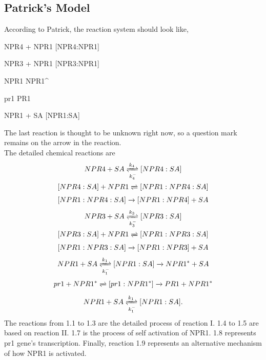\subsection{Patrick's Model}
According to Patrick, the reaction system should look like,
\begin{chemmath}
	NPR4 + NPR1 
	[NPR4:NPR1]
\end{chemmath}
\begin{chemmath}
	NPR3 + NPR1
	[NPR3:NPR1]
\end{chemmath}
\begin{chemmath}
	NPR1
	NPR1^{\ast}
\end{chemmath}
\begin{chemmath}
	pr1
	PR1
\end{chemmath}
\begin{chemmath}
	NPR1 + SA 
	[NPR1:SA]
\end{chemmath}
The last reaction is thought to be unknown right now, so a question mark remains on the arrow in the reaction. \\
The detailed chemical reactions are
\begin{gather}\label{P_re_I}
NPR4 + SA \xrightleftharpoons[k_4^-]{k_4} [NPR4:SA] \\
[NPR4:SA] + NPR1 \xrightleftharpoons[]{} [NPR1:NPR4:SA] \\
[NPR1:NPR4:SA] \xrightarrow{} [NPR1:NPR4] + SA
\end{gather}
\begin{gather}
NPR3 + SA \xrightleftharpoons[k_3^-]{k_3} [NPR3:SA] \\
[NPR3:SA] + NPR1 \xrightleftharpoons[]{} [NPR1:NPR3:SA] \\
[NPR1:NPR3:SA] \xrightarrow{} [NPR1:NPR3] + SA
\end{gather}
\begin{gather}
NPR1 + SA \xrightleftharpoons[k_1^{-}]{k_1} [NPR1:SA] \xrightarrow{} NPR1^{\ast} + SA
\end{gather}
\begin{gather}
pr1 + NPR1^{\ast} \xrightleftharpoons[]{} [pr1:NPR1^{\ast}] \xrightarrow{} PR1 + NPR1^{\ast}
\end{gather}
\begin{gather}
NPR1 + SA \xrightleftharpoons[k_1^{-}]{k_1} [NPR1:SA].
\end{gather}
The reactions from 1.1 to 1.3 are the detailed process of reaction I. 1.4 to 1.5 are based on reaction II. 1.7 is the process of self activation of NPR1. 1.8 represents pr1 gene's transcription. Finally, reaction 1.9 represents an alternative mechanism of how NPR1 is activated.\\
